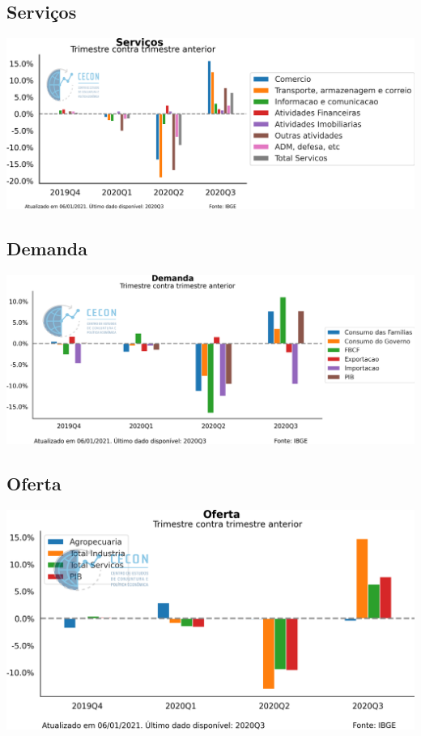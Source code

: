 \documentclass{SelfArx}
\begin{document}
\subsection*{Serviços}
\label{sec:orgf5b6b8e}

\begin{center}
\includegraphics[width=.9\linewidth]{./figs/PIB/Servicos.png}
\end{center}

\subsection*{Demanda}
\label{sec:org02aed2c}

\begin{center}
\includegraphics[width=.9\linewidth]{./figs/PIB/Demanda.png}
\end{center}

\subsection*{Oferta}
\label{sec:orgef22996}


\begin{center}
\includegraphics[width=.9\linewidth]{./figs/PIB/Oferta.png}
\end{center}
\end{document}
